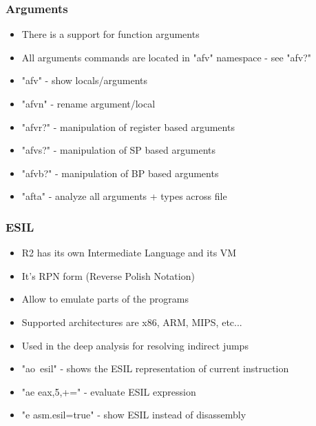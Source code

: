 \documentclass[10pt,pdf,utf8,english,compress,hyperref={unicode}]{beamer}
\begin{document}
\begin{frame}[fragile]
  \frametitle{Arguments}
  \begin{itemize}
	  \item There is a support for function arguments
	  \item All arguments commands are located in "afv" namespace - see "afv?"
	  \item "afv" - show locals/arguments
	  \item "afvn" - rename argument/local
	  \item "afvr?" - manipulation of register based arguments
	  \item "afvs?" - manipulation of SP based arguments
	  \item "afvb?" - manipulation of BP based arguments
	  \item "afta" - analyze all arguments + types across file
  \end{itemize}
\end{frame}

\begin{frame}[fragile]
  \frametitle{ESIL}
  \begin{itemize}
	  \item R2 has its own Intermediate Language and its VM
	  \item It's RPN form (Reverse Polish Notation)
	  \item Allow to emulate parts of the programs
	  \item Supported architectures are x86, ARM, MIPS, etc...
	  \item Used in the deep analysis for resolving indirect jumps
	  \item "ao~esil" - shows the ESIL representation of current instruction
	  \item "ae eax,5,+=" - evaluate ESIL expression
	  \item "e asm.esil=true" - show ESIL instead of disassembly
  \end{itemize}
\end{frame}

\end{document}
